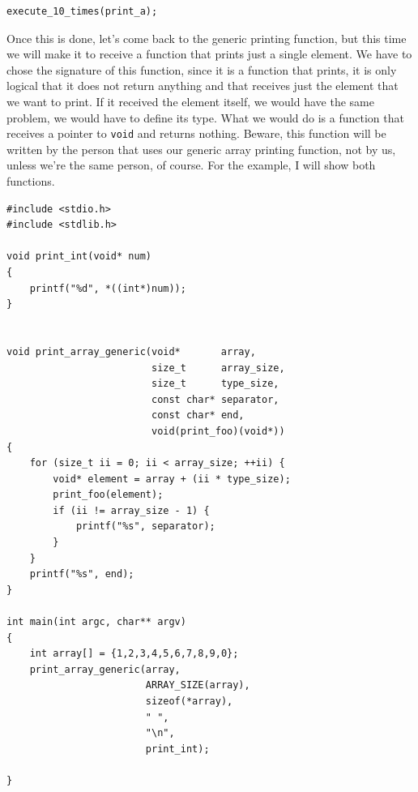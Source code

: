 \documentclass[a4paper]{article}
\begin{document}
\noindent
\begin{minipage}[H]{\linewidth}
\begin{lstlisting}[style=C, label={lst:foocall},
caption={Call to a function that receives a function pointer}]
execute_10_times(print_a);
\end{lstlisting}
\end{minipage}

Once this is done, let's come back to the generic printing function, but this
time we will make it to receive a function that prints just a single element.
We have to chose the signature of this function, since it is a function that
prints, it is only logical that it does not return anything and that receives
just the element that we want to print. If it received the element itself,
we would have the same problem, we would have to define its type. What we would
do is a function that receives a pointer to \verb!void! and returns nothing.
Beware, this function will be written by the person that uses our generic array
printing function, not by us, unless we're the same person, of course. For the
example, I will show both functions.

\noindent
\begin{minipage}[H]{\linewidth}
\mbox{}
\begin{lstlisting}[style=C,
caption={Generic printing function definition},
label={lst:printArrayGeneric2}]
#include <stdio.h>
#include <stdlib.h>

void print_int(void* num)
{
    printf("%d", *((int*)num));
}


void print_array_generic(void*       array,
                         size_t      array_size,
                         size_t      type_size,
                         const char* separator,
                         const char* end,
                         void(print_foo)(void*))
{
    for (size_t ii = 0; ii < array_size; ++ii) {
        void* element = array + (ii * type_size);
        print_foo(element);
        if (ii != array_size - 1) {
            printf("%s", separator);
        }
    }
    printf("%s", end);
}

int main(int argc, char** argv)
{
    int array[] = {1,2,3,4,5,6,7,8,9,0};
    print_array_generic(array,
                        ARRAY_SIZE(array),
                        sizeof(*array),
                        " ",
                        "\n",
                        print_int);

}
\end{lstlisting}
\end{minipage}
\end{document}
